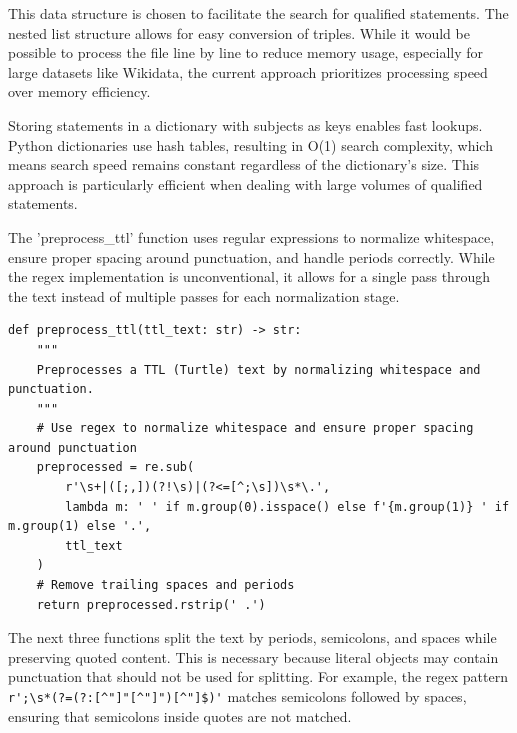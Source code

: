 This data structure is chosen to facilitate the search for qualified statements. The nested list structure allows for easy conversion of triples. While it would be possible to process the file line by line to reduce memory usage, especially for large datasets like Wikidata, the current approach prioritizes processing speed over memory efficiency.

Storing statements in a dictionary with subjects as keys enables fast lookups. Python dictionaries use hash tables, resulting in O(1) search complexity, which means search speed remains constant regardless of the dictionary's size. This approach is particularly efficient when dealing with large volumes of qualified statements.

The 'preprocess\_ttl' function uses regular expressions to normalize whitespace, ensure proper spacing around punctuation, and handle periods correctly. While the regex implementation is unconventional, it allows for a single pass through the text instead of multiple passes for each normalization stage.

{\footnotesize
\begin{verbatim}
def preprocess_ttl(ttl_text: str) -> str:
    """
    Preprocesses a TTL (Turtle) text by normalizing whitespace and punctuation.
    """
    # Use regex to normalize whitespace and ensure proper spacing around punctuation
    preprocessed = re.sub(
        r'\s+|([;,])(?!\s)|(?<=[^;\s])\s*\.',
        lambda m: ' ' if m.group(0).isspace() else f'{m.group(1)} ' if m.group(1) else '.',
        ttl_text
    )
    # Remove trailing spaces and periods
    return preprocessed.rstrip(' .')
\end{verbatim}
}

The next three functions split the text by periods, semicolons, and spaces while preserving quoted content. This is necessary because literal objects may contain punctuation that should not be used for splitting. For example, the regex pattern \verb|r';\s*(?=(?:[^"]"[^"]")[^"]$)'| matches semicolons followed by spaces, ensuring that semicolons inside quotes are not matched.

